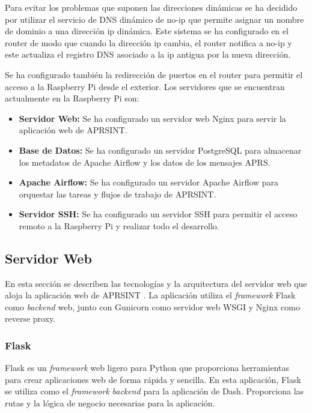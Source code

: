 Para evitar los problemas que suponen las direcciones dinámicas se ha decidido por utilizar el servicio de DNS dinámico de no-ip que permite asignar un nombre de dominio a una dirección ip dinámica. Este sistema se ha configurado en el router de modo que cuando la dirección ip cambia, el router notifica a no-ip y este actualiza el registro DNS asociado a la ip antigua por la nueva dirección.

Se ha configurado también la redirección de puertos en el router para permitir el acceso a la Raspberry Pi desde el exterior. Los servidores que se encuentran actualmente en la Raspberry Pi son:
\begin{itemize}
	\item \textbf{Servidor Web:} Se ha configurado un servidor web Nginx para servir la aplicación web de APRSINT.
	\item \textbf{Base de Datos:} Se ha configurado un servidor PostgreSQL para almacenar los metadatos de Apache Airflow y los datos de los mensajes APRS.
	\item \textbf{Apache Airflow:} Se ha configurado un servidor Apache Airflow para orquestar las tareas y flujos de trabajo de APRSINT.
	\item \textbf{Servidor SSH:} Se ha configurado un servidor SSH para permitir el acceso remoto a la Raspberry Pi y realizar todo el desarrollo.
\end{itemize}

\subsection{Servidor Web}

En esta sección se describen las tecnologías y la arquitectura del servidor web que aloja la aplicación web de APRSINT \cite{WebServer}. La aplicación utiliza el \textit{framework} Flask como \textit{backend} web, junto con Gunicorn como servidor web WSGI y Nginx como reverse proxy.

\subsubsection*{Flask}

Flask es un \textit{framework} web ligero para Python que proporciona herramientas para crear aplicaciones web de forma rápida y sencilla. En esta aplicación, Flask se utiliza como el \textit{framework} \textit{backend} para la aplicación de Dash. Proporciona las rutas y la lógica de negocio necesarias para la aplicación.

